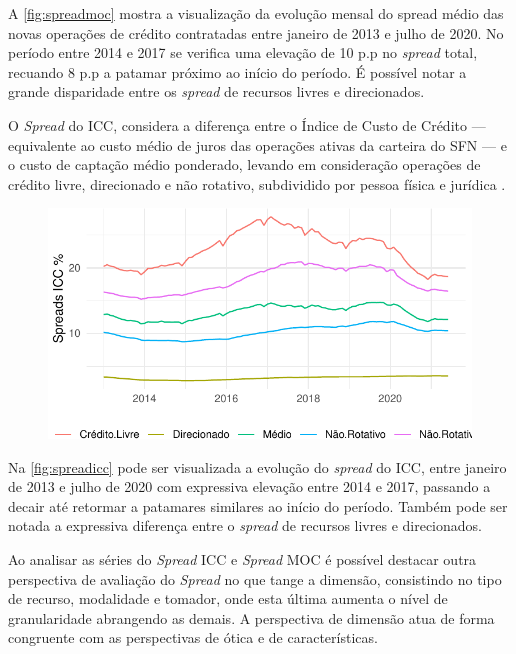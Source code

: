 \documentclass[12pt,12pt,openright,oneside,a4paper,chapter=TITLE,section=TITLE,subsection=TITLE,subsubsection=TITLE,english,french,spanish,portugues,sumario=tradicional]{abntex2}
\begin{document}
A \autoref{fig:spreadmoc} mostra a visualização da evolução mensal do spread
médio das novas operações de crédito contratadas entre janeiro de 2013 e julho
de 2020. No período entre 2014 e 2017 se verifica uma elevação de 10 p.p no
\emph{spread} total, recuando 8 p.p a patamar próximo ao início do período. É possível notar a grande disparidade entre os \emph{spread} de recursos livres e direcionados.

O \emph{Spread} do ICC, considera a diferença entre o Índice de Custo de Crédito --- equivalente ao custo médio de juros das operações ativas da carteira do SFN --- e o custo de captação médio ponderado, levando em consideração operações de crédito livre, direcionado e não rotativo, subdividido por pessoa física e jurídica \cite{BCB:2016}.

\begin{figure}

\begin{center}\includegraphics{12-exportedfigures/spread 2019 icc-1} \end{center}
\label{fig:spreadicc}
\end{figure}

Na \autoref{fig:spreadicc} pode ser visualizada a evolução do \emph{spread} do ICC,
entre janeiro de 2013 e julho de 2020 com expressiva elevação entre 2014 e
2017, passando a decair até retormar a patamares similares ao início do
período. Também pode ser notada a expressiva diferença entre o \emph{spread} de
recursos livres e direcionados.

Ao analisar as séries do \emph{Spread} ICC e \emph{Spread} MOC é possível destacar outra perspectiva de avaliação do \emph{Spread} no que tange a dimensão, consistindo no tipo de recurso, modalidade e tomador, onde esta última aumenta o nível de granularidade abrangendo as demais. A perspectiva de dimensão atua de forma congruente com as perspectivas de ótica e de características.
\end{document}
